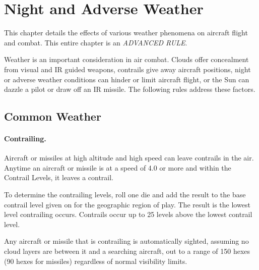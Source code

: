 \section{Night and Adverse Weather}

This chapter details the effects of various weather phenomena on aircraft flight and combat. This entire chapter is an \emph{ADVANCED RULE}.

Weather is an important consideration in air combat. Clouds offer concealment from visual and IR guided weapons, contrails give away aircraft positions, night or adverse weather conditions can hinder or limit aircraft flight, or the Sun can dazzle a pilot or draw off an IR missile. The following rules address these factors.

\subsection{Common Weather}


\paragraph{Contrailing.} Aircraft or missiles at high altitude and high speed can leave contrails in the air. Anytime an aircraft or missile is at a speed of 4.0 or more and within the Contrail Levels, it leaves a contrail.

To determine the contrailing levels, roll one die and add the result to the base contrail level given on  for the geographic region of play. The result is the lowest level contrailing occurs. Contrails occur up to 25 levels above the lowest contrail level.

Any aircraft or missile that is contrailing is automatically sighted, assuming no cloud layers are between it and a searching aircraft, out to a range of 150 hexes (90 hexes for missiles) regardless of normal visibility limits.

